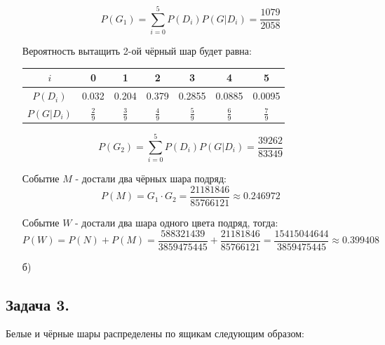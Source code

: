 \begin{enumerate}
	\[ P(G_1) = \sum_{i=0}^{5} P(D_i)P(G|D_i) = \dfrac{1079}{2058} \]
	
	Вероятность вытащить 2-ой чёрный шар будет равна:
	
	\begin{table}[H]
		\centering\makegapedcells
		\begin{tabular}{|c|c|c|c|c|c|c|}
			\hline
			$i$        & 0              & 1              & 2              & 3              & 4              & 5              \\ \hline
			$P(D_i)$   & 0.032          & 0.204          & 0.379          & 0.2855         & 0.0885         & 0.0095         \\ \hline
			$P(G|D_i)$ & $\frac{2}{9}$ & $\frac{3}{9}$ & $\frac{4}{9}$ & $\frac{5}{9}$ & $\frac{6}{9}$ & $\frac{7}{9}$ \\ \hline
		\end{tabular}
	\end{table}
	
	\[ P(G_2) = \sum_{i=0}^{5} P(D_i)P(G|D_i) = \dfrac{39262}{83349} \]
	
	Событие $M$ - достали два чёрных шара подряд:
	\[ P(M) = G_1 \cdot G_2 = \dfrac{21181846}{85766121} \approx 0.246972 \]
	
	Событие $W$ - достали два шара одного цвета подряд, тогда:
	\[ P(W) = P(N) + P(M) = \dfrac{588321439}{3859475445} + \dfrac{21181846}{85766121} = \dfrac{15415044644}{3859475445} \approx 0.399408 \]
	
	\item[б)] 
\end{enumerate}

\newpage










\subsection*{Задача 3.}

Белые и чёрные шары распределены по ящикам следующим образом:

\begin{figure}[H]
\end{figure}

